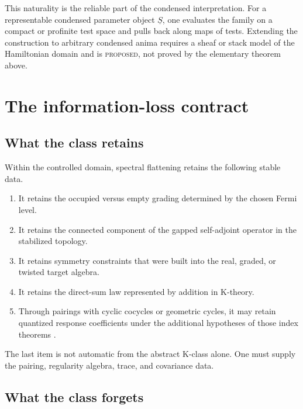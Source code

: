 \documentclass[12pt]{article}
\theoremstyle{definition}
\theoremstyle{remark}
\newcommand{\status}[1]{\textsc{#1}}
\begin{document}
This naturality is the reliable part of the condensed interpretation.
For a representable condensed parameter object $\underline S$, one evaluates
the family on a compact or profinite test space and pulls back along maps of
tests.
Extending the construction to arbitrary condensed anima requires a sheaf or
stack model of the Hamiltonian domain and is \status{proposed}, not proved by
the elementary theorem above.

\section{The information-loss contract}

\subsection{What the class retains}

Within the controlled domain, spectral flattening retains the following
stable data.

\begin{enumerate}[label=(\roman*)]
  \item It retains the occupied versus empty grading determined by the chosen
  Fermi level.

  \item It retains the connected component of the gapped self-adjoint
  operator in the stabilized topology.

  \item It retains symmetry constraints that were built into the real,
  graded, or twisted target algebra.

  \item It retains the direct-sum law represented by addition in K-theory.

  \item Through pairings with cyclic cocycles or geometric cycles, it may
  retain quantized response coefficients under the additional hypotheses of
  those index theorems \cite{Bellissard1994,ProdanSchulzBaldes2016}.
\end{enumerate}

The last item is not automatic from the abstract K-class alone.
One must supply the pairing, regularity algebra, trace, and covariance data.

\subsection{What the class forgets}
\end{document}
